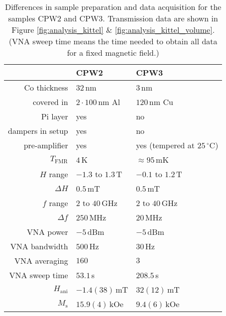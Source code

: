 \begin{landscape}
\begin{multicols}{2}
\begin{table}[H]
\begin{tabular}{l|l}
    \end{tabular}
    \label{tab:setup_sampleprep}
\end{table}
\begin{table}[H]
    \centering
    \caption[Differences in data acquisition for the samples CPW2 and CPW3]{Differences in sample preparation and data acquisition for the samples CPW2 and CPW3. Transmission data are shown in Figure \ref{fig:analysis_kittel} \& \ref{fig:analysis_kittel_volume}. (VNA sweep time means the time needed to obtain all data for a fixed magnetic field.)}
    \vspace{4mm}
    \begin{tabular}{r|ll}
         & CPW2& CPW3\\\hline
         Co thickness& $32\,$nm & $3\,$nm \\
         covered in & $2 \cdot 100\,$nm Al& $120\,$nm Cu \\
         \vspace{3mm}Pi layer & yes& no \\\hline
         dampers in setup & yes& no \\
         pre-amplifier & yes& yes (tempered at $25\,^\circ$C) \\
         \vspace{3mm} $T_\text{FMR}$ & $4\,$K& $\approx 95\,$mK \\\hline
         $H$ range & $-1.3$ to $1.3\,$T& $-0.1$ to $1.2\,$T\\
         \vspace{3mm}$\Delta H$ &$0.5\,$mT&$0.5\,$mT\\\hline
         $f$ range & $2$ to $40\,$GHz& $2$ to $40\,$GHz \\
         \vspace{3mm}$\Delta f$ & $250\,$MHz& $20\,$MHz \\\hline
         VNA power &$-5\,$dBm&$-5\,$dBm\\
         VNA bandwidth & $500\,$Hz&$30\,$Hz \\
         VNA averaging & $160$& $3$ \\
         \vspace{3mm}VNA sweep time &$53.1\,$s&$208.5\,$s\\\hline
         $H_\text{ani}$&$-1.4(38)\,$mT& $32(12)\,$mT\\
         $M_\text{s}$&$15.9(4)\,$kOe& $9.4(6)\,$kOe
    \end{tabular}
    \label{tab:analysis_kittel}
\end{table}
\newpage


\end{multicols}
\end{landscape}
